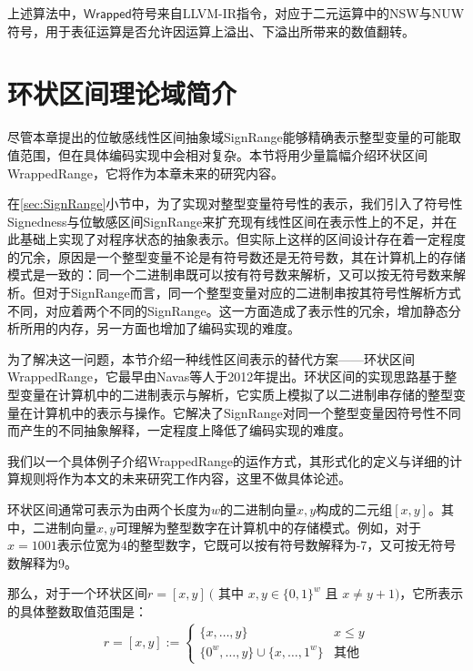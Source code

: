 上述算法中，$ \mathsf{Wrapped} $符号来自LLVM-IR指令，对应于二元运算中的NSW与NUW符号，用于表征运算是否允许因运算上溢出、下溢出所带来的数值翻转。

\section{环状区间理论域简介}
\label{sec:WrappedRange}

尽管本章提出的位敏感线性区间抽象域SignRange能够精确表示整型变量的可能取值范围，但在具体编码实现中会相对复杂。本节将用少量篇幅介绍环状区间WrappedRange，它将作为本章未来的研究内容。

在\ref{sec:SignRange}小节中，为了实现对整型变量符号性的表示，我们引入了符号性Signedness与位敏感区间SignRange来扩充现有线性区间在表示性上的不足，并在此基础上实现了对程序状态的抽象表示。但实际上这样的区间设计存在着一定程度的冗余，原因是一个整型变量不论是有符号数还是无符号数，其在计算机上的存储模式是一致的：同一个二进制串既可以按有符号数来解析，又可以按无符号数来解析。但对于SignRange而言，同一个整型变量对应的二进制串按其符号性解析方式不同，对应着两个不同的SignRange。这一方面造成了表示性的冗余，增加静态分析所用的内存，另一方面也增加了编码实现的难度。

为了解决这一问题，本节介绍一种线性区间表示的替代方案——环状区间WrappedRange\cite{navas2012signedness, gange2015interval}，它最早由Navas等人于2012年提出。环状区间的实现思路基于整型变量在计算机中的二进制表示与解析，它实质上模拟了以二进制串存储的整型变量在计算机中的表示与操作。它解决了SignRange对同一个整型变量因符号性不同而产生的不同抽象解释，一定程度上降低了编码实现的难度。

我们以一个具体例子介绍WrappedRange的运作方式，其形式化的定义与详细的计算规则将作为本文的未来研究工作内容，这里不做具体论述。

环状区间通常可表示为由两个长度为$ w $的二进制向量$ x, y $构成的二元组$ [x, y] $。其中，二进制向量$ x, y $可理解为整型数字在计算机中的存储模式。例如，对于$ x = 1001 $表示位宽为4的整型数字，它既可以按有符号数解释为-7，又可按无符号数解释为9。

那么，对于一个环状区间$ r = [x, y] ~($ 其中 $x, y \in \{0, 1\}^w $ 且 $ x \ne y + 1) $，它所表示的具体整数取值范围是：
\begin{align}
	r = [x, y] := \begin{cases}
	\{x, \dots, y\} & x \le y\\
	\{0^w, \dots, y\} \cup \{x, \dots, 1^w\} & \text{其他}
	\end{cases}
\end{align}

